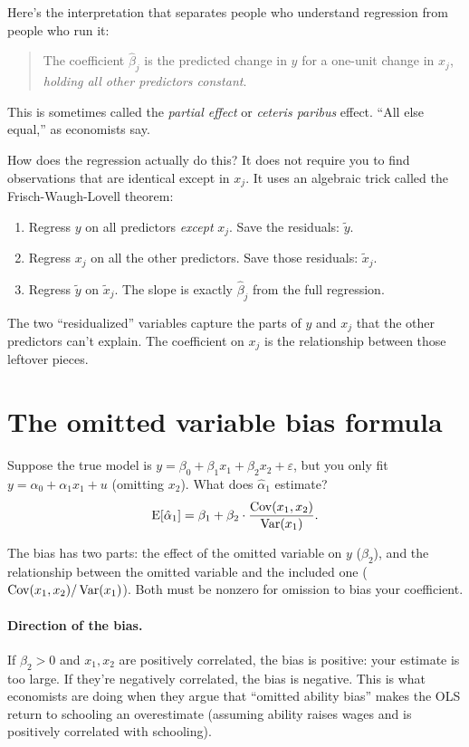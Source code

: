 Here's the interpretation that separates people who understand regression from people who run it:

\begin{quote}
The coefficient $\hat\beta_j$ is the predicted change in $y$ for a one-unit change in $x_j$, \emph{holding all other predictors constant}.
\end{quote}

This is sometimes called the \emph{partial effect} or \emph{ceteris paribus} effect. ``All else equal,'' as economists say.

How does the regression actually do this? It does not require you to find observations that are identical except in $x_j$. It uses an algebraic trick called the Frisch-Waugh-Lovell theorem:
\begin{enumerate}
  \item Regress $y$ on all predictors \emph{except} $x_j$. Save the residuals: $\tilde{y}$.
  \item Regress $x_j$ on all the other predictors. Save those residuals: $\tilde{x}_j$.
  \item Regress $\tilde{y}$ on $\tilde{x}_j$. The slope is exactly $\hat\beta_j$ from the full regression.
\end{enumerate}
The two ``residualized'' variables capture the parts of $y$ and $x_j$ that the other predictors can't explain. The coefficient on $x_j$ is the relationship between those leftover pieces.

\section{The omitted variable bias formula}

Suppose the true model is $y = \beta_0 + \beta_1 x_1 + \beta_2 x_2 + \varepsilon$, but you only fit $y = \alpha_0 + \alpha_1 x_1 + u$ (omitting $x_2$). What does $\hat\alpha_1$ estimate?
\begin{equation}
  \operatorname{E}[\hat\alpha_1] = \beta_1 + \beta_2 \cdot \frac{\operatorname{Cov}(x_1, x_2)}{\operatorname{Var}(x_1)}.
  \label{eq:omitted-variable-bias}
\end{equation}

The bias has two parts: the effect of the omitted variable on $y$ ($\beta_2$), and the relationship between the omitted variable and the included one ($\operatorname{Cov}(x_1, x_2)/\operatorname{Var}(x_1)$). Both must be nonzero for omission to bias your coefficient.

\paragraph{Direction of the bias.} If $\beta_2 > 0$ and $x_1, x_2$ are positively correlated, the bias is positive: your estimate is too large. If they're negatively correlated, the bias is negative. This is what economists are doing when they argue that ``omitted ability bias'' makes the OLS return to schooling an overestimate (assuming ability raises wages and is positively correlated with schooling).

